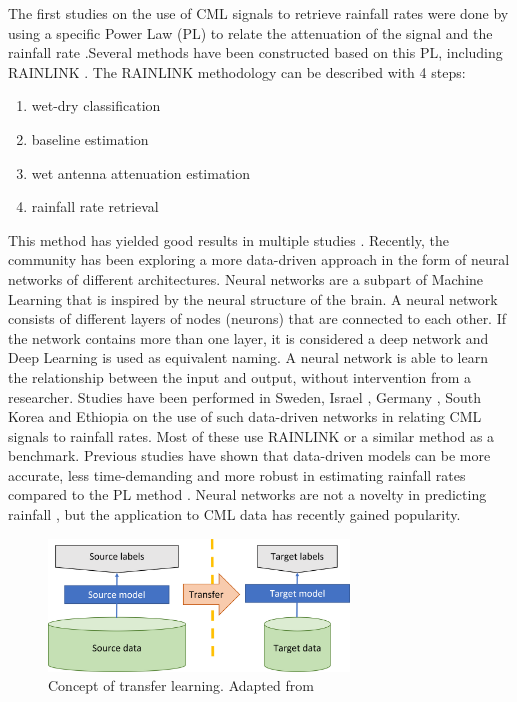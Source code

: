 \documentclass[twocolumn, 10pt, a4paper]{memoir}
\begin{document}
	The first studies on the use of CML signals to retrieve rainfall rates were done by using a specific Power Law (PL) to relate the attenuation of the signal and the rainfall rate .Several methods have been constructed based on this PL, including RAINLINK . The RAINLINK methodology can be described with 4 steps: 
	\begin{enumerate}
		\item wet-dry classification
		\item baseline estimation
		\item wet antenna attenuation estimation
		\item rainfall rate retrieval
	\end{enumerate}
	This method has yielded good results in multiple studies . Recently, the community has been exploring a more data-driven approach in the form of neural networks of different architectures. Neural networks are a subpart of Machine Learning that is inspired by the neural structure of the brain. A neural network consists of different layers of nodes (neurons) that are connected to each other. If the network contains more than one layer, it is considered a deep network and Deep Learning is used as equivalent naming. A neural network is able to learn the relationship between the input and output, without intervention from a researcher. Studies have been performed in Sweden, Israel , Germany , South Korea and Ethiopia \cite{Diba2021} on the use of such data-driven networks in relating CML signals to rainfall rates. Most of these use RAINLINK or a similar method as a benchmark. Previous studies have shown that data-driven models can be more accurate, less time-demanding and more robust in estimating rainfall rates compared to the PL method .  Neural networks are not a novelty in predicting rainfall , but the application to CML data has recently gained popularity.
	
	\begin{figure}[t]
		\includegraphics[width=8cm]{Transfer_learning_concept}
		\caption{Concept of transfer learning. Adapted from \protect\cite{Sarkar2018} }
		\label{fig:transferconcept}
	\end{figure}
	
\end{document}
